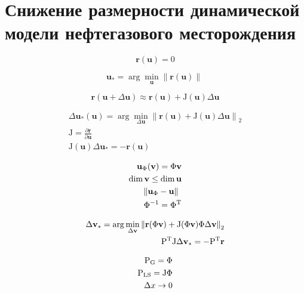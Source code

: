 \chapter{Снижение размерности динамической модели нефтегазового месторождения}\label{ch:ch2}


\newcommand{\bvec}[1]{\mathbf{#1}}
\newcommand{\resid}{\bvec{r}}
\newcommand{\unk}{\bvec{u}}
\newcommand{\jac}{\mathrm{J}}
\newcommand{\dunk}{\Delta \unk}
\newcommand{\vunk}{\bvec{v}}
\newcommand{\matr}[1]{\mathrm{\uppercase{#1}}}
\newcommand{\norm}[2][~]{\left\| #2  \right\|_{#1}}
\newcommand{\transpose}[1]{\matr{#1}^\mathrm{T}}
\newcommand{\dvunk}{\Delta \vunk}
\newcommand{\deriv}[2]{\frac{\partial #1}{\partial #2}}

\begin{equation}
   \resid(\unk) = 0
\end{equation}

\begin{equation}
    \unk_\ast = \arg \min_{\unk} \norm{\resid(\unk)}
\end{equation}

\begin{equation}
    \resid(\unk + \Delta \unk) \approx \resid(\unk) + \jac(\unk) \dunk
\end{equation}

\begin{align}
    \dunk_\ast (\unk) = \arg \min_{\dunk} \norm[2]{\resid(\unk) + \jac(\unk) \dunk} \\
    \jac = \deriv{\resid}{\unk} \\
    \jac(\unk) \dunk_\ast = - \resid(\unk)
\end{align}

\begin{align}
    \unk_\Phi (\vunk) = \Phi \vunk \\
    \dim{\vunk} \leq \dim{\unk} \\
    \norm{\unk_\Phi - \unk} \\
    \Phi^{-1} = \transpose{\Phi}
\end{align}

\begin{align}
    \dvunk_\ast = \arg \min_{\dvunk} \norm[2]{\resid(\Phi \vunk) + \jac(\Phi \vunk) \Phi \dvunk} \\
    \transpose{P}\jac \dvunk_\ast = - \transpose{P} \resid
\end{align}

\begin{align}
    \matr{P}_\text{G} = \Phi \\
    \matr{P}_\text{LS} = \jac \Phi \\
    \Delta x \rightarrow 0
\end{align}

